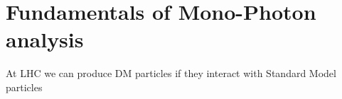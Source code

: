 \chapter{Fundamentals of Mono-Photon analysis}
At LHC we can produce DM particles if they interact with Standard Model particles
